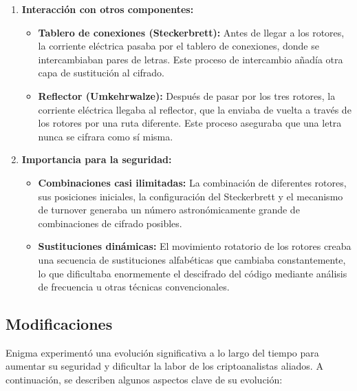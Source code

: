 \documentclass{article}
\begin{document}
\begin{enumerate}
    \item \textbf{Interacción con otros componentes:}
    \begin{itemize}
        \item \textbf{Tablero de conexiones (Steckerbrett):} Antes de llegar a los rotores, la corriente eléctrica pasaba por el tablero de conexiones, donde se intercambiaban pares de letras. Este proceso de intercambio añadía otra capa de sustitución al cifrado.
        \item \textbf{Reflector (Umkehrwalze):} Después de pasar por los tres rotores, la corriente eléctrica llegaba al reflector, que la enviaba de vuelta a través de los rotores por una ruta diferente. Este proceso aseguraba que una letra nunca se cifrara como sí misma.
    \end{itemize}

    \item \textbf{Importancia para la seguridad:}
    \begin{itemize}
        \item \textbf{Combinaciones casi ilimitadas:} La combinación de diferentes rotores, sus posiciones iniciales, la configuración del Steckerbrett y el mecanismo de turnover generaba un número astronómicamente grande de combinaciones de cifrado posibles.
        \item \textbf{Sustituciones dinámicas:} El movimiento rotatorio de los rotores creaba una secuencia de sustituciones alfabéticas que cambiaba constantemente, lo que dificultaba enormemente el descifrado del código mediante análisis de frecuencia u otras técnicas convencionales.
    \end{itemize}
\end{enumerate}


\subsection{Modificaciones}


Enigma experimentó una evolución significativa a lo largo del tiempo 
para aumentar su seguridad y dificultar la labor de los criptoanalistas aliados. 
A continuación, se describen algunos aspectos clave de su evolución:
\end{document}
